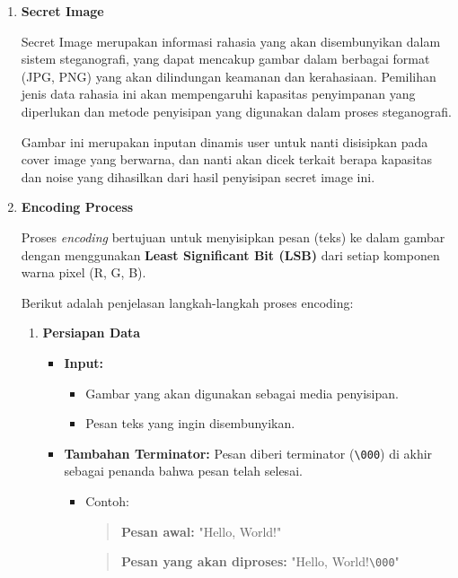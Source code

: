 \documentclass{ittelkom}
\begin{document}
\begin{enumerate}
    \item \textbf{Secret Image}

          Secret Image merupakan informasi rahasia yang akan disembunyikan dalam sistem
          steganografi, yang dapat mencakup gambar dalam berbagai format (JPG, PNG) yang
          akan dilindungan keamanan dan kerahasiaan. Pemilihan jenis data rahasia ini
          akan mempengaruhi kapasitas penyimpanan yang diperlukan dan metode penyisipan
          yang digunakan dalam proses steganografi.

          Gambar ini merupakan inputan dinamis user untuk nanti disisipkan pada cover
          image yang berwarna, dan nanti akan dicek terkait berapa kapasitas dan noise
          yang dihasilkan dari hasil penyisipan secret image ini.

    \item \textbf{Encoding Process}

          Proses \textit{encoding} bertujuan untuk menyisipkan pesan (teks) ke dalam
          gambar dengan menggunakan \textbf{Least Significant Bit (LSB)} dari setiap
          komponen warna pixel (R, G, B).

          Berikut adalah penjelasan langkah-langkah proses encoding:

          \begin{enumerate}
              \item \textbf{Persiapan Data}

                    \begin{itemize}
                        \item \textbf{Input:}
                              \begin{itemize}
                                  \item Gambar yang akan digunakan sebagai media penyisipan.
                                  \item Pesan teks yang ingin disembunyikan.
                              \end{itemize}

                        \item \textbf{Tambahan Terminator:}
                              Pesan diberi terminator (\texttt{\textbackslash 000}) di akhir sebagai penanda bahwa pesan telah selesai.
                              \begin{itemize}
                                  \item Contoh:
                                        \begin{quote}
                                            \textbf{Pesan awal:} "Hello, World!"
                                        \end{quote}
                                        \begin{quote}
                                            \textbf{Pesan yang akan diproses:} "Hello, World!\texttt{\textbackslash 000}"
                                        \end{quote}
                              \end{itemize}


\end{itemize}
\end{enumerate}
\end{enumerate}
\end{document}
